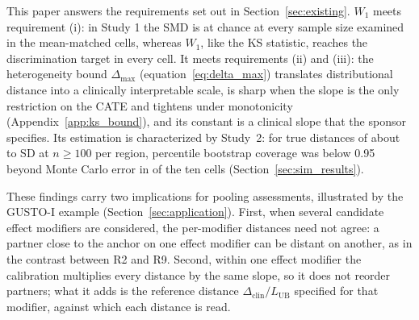 \documentclass[AMA,Times1COL]{WileyNJDv5}
\begin{document}
This paper answers the requirements set out in Section~\ref{sec:existing}. $W_1$ meets requirement (i): in Study 1 the SMD is at chance at every sample size examined in the mean-matched cells, whereas $W_1$, like the KS statistic, reaches the discrimination target in every cell. It meets requirements (ii) and (iii): the heterogeneity bound \(\Delta_{\max}\) (equation~\ref{eq:delta_max}) translates distributional distance into a clinically interpretable scale, is sharp when the slope is the only restriction on the CATE and tightens under monotonicity (Appendix~\ref{app:ks_bound}), and its constant is a clinical slope that the sponsor specifies. Its estimation is characterized by Study~2: for true distances of about  to  SD at $n \geq 100$ per region, percentile bootstrap coverage was below 0.95 beyond Monte Carlo error in  of the ten cells (Section~\ref{sec:sim_results}).

These findings carry two implications for pooling assessments, illustrated by the GUSTO-I example (Section~\ref{sec:application}). First, when several candidate effect modifiers are considered, the per-modifier distances need not agree: a partner close to the anchor on one effect modifier can be distant on another, as in the contrast between R2 and R9. Second, within one effect modifier the calibration multiplies every distance by the same slope, so it does not reorder partners; what it adds is the reference distance $\Delta_{\text{clin}} / L_{\text{UB}}$ specified for that modifier, against which each distance is read.
\end{document}
